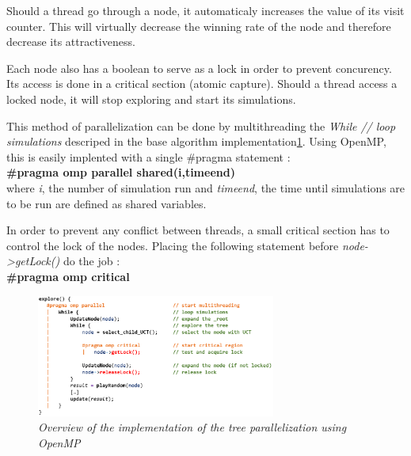 Should a thread go through a node, it automaticaly increases the value of its visit counter. This will virtually decrease the winning rate of the node and therefore decrease its attractiveness.

Each node also has a boolean to serve as a lock in order to prevent concurency. Its access is done in a critical section (atomic capture). Should a thread access a locked node, it will stop exploring and start its simulations.

This method of parallelization can be done by multithreading the \textit{While // loop simulations} descriped in the base algorithm implementation\ref{fig:MCTSAlgorithmOMP}. Using OpenMP, this is easily implented with a single \#pragma statement :\\
\textbf{\#pragma omp parallel shared(i,timeend)}\\
where \textit{i}, the number of simulation run and \textit{timeend}, the time until simulations are to be run are defined as shared variables.

In order to prevent any conflict between threads, a small critical section has to control the lock of the nodes. Placing the following statement before \textit{node->getLock()} do the job :\\
\textbf{\#pragma omp critical}

\begin{figure}[H]
\centerline{\includegraphics[width=0.7\textwidth]{Parallelisation/Computer/Img/omp.png}}
\caption{\label{fig:MCTSAlgorithmOMP}\textit{Overview of the implementation of the tree parallelization using OpenMP}}
\end{figure}
